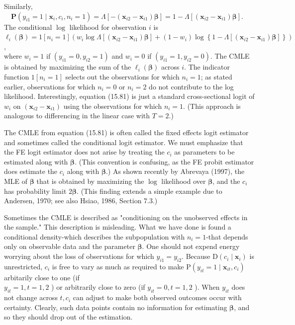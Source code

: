 \documentclass[10pt]{article}
\begin{document}
Similarly, $\quad \mathbf{P}\left(y_{i 1}=1 \mid \mathbf{x}_{i}, c_{i}, n_{i}=1\right)=\Lambda\left[-\left(\mathbf{x}_{i 2}-\mathbf{x}_{i 1}\right) \boldsymbol{\beta}\right]=1-\Lambda\left[\left(\mathbf{x}_{i 2}-\mathbf{x}_{i 1}\right) \boldsymbol{\beta}\right]$. The conditional $\log$ likelihood for observation $i$ is\\
$\ell_{i}(\boldsymbol{\beta})=1\left[n_{i}=1\right]\left(w_{i} \log \Lambda\left[\left(\mathbf{x}_{i 2}-\mathbf{x}_{i 1}\right) \boldsymbol{\beta}\right]+\left(1-w_{i}\right) \log \left\{1-\Lambda\left[\left(\mathbf{x}_{i 2}-\mathbf{x}_{i 1}\right) \boldsymbol{\beta}\right]\right\}\right)$,\\
where $w_{i}=1$ if $\left(y_{i 1}=0, y_{i 2}=1\right)$ and $w_{i}=0$ if $\left(y_{i 1}=1, y_{i 2}=0\right)$. The CMLE is obtained by maximizing the sum of the $\ell_{i}(\boldsymbol{\beta})$ across $i$. The indicator function $1\left[n_{i}=1\right]$ selects out the observations for which $n_{i}=1$; as stated earlier, observations for which $n_{i}=0$ or $n_{i}=2$ do not contribute to the log likelihood. Interestingly, equation (15.81) is just a standard cross-sectional logit of $w_{i}$ on $\left(\mathbf{x}_{i 2}-\mathbf{x}_{i 1}\right)$ using the observations for which $n_{i}=1$. (This approach is analogous to differencing in the linear case with $T=2$.)

The CMLE from equation (15.81) is often called the fixed effects logit estimator and sometimes called the conditional logit estimator. We must emphasize that the FE logit estimator does not arise by treating the $c_{i}$ as parameters to be estimated along with $\boldsymbol{\beta}$. (This convention is confusing, as the FE probit estimator does estimate the $c_{i}$ along with $\boldsymbol{\beta}$.) As shown recently by Abrevaya (1997), the MLE of $\boldsymbol{\beta}$ that is obtained by maximizing the $\log$ likelihood over $\boldsymbol{\beta}$, and the $c_{i}$ has probability limit $2 \boldsymbol{\beta}$. (This finding extends a simple example due to Andersen, 1970; see also Hsiao, 1986, Section 7.3.)

Sometimes the CMLE is described as "conditioning on the unobserved effects in the sample." This description is misleading. What we have done is found a conditional density-which describes the subpopulation with $n_{i}=1$-that depends only on observable data and the parameter $\boldsymbol{\beta}$. One should not expend energy worrying about the loss of observations for which $y_{i 1}=y_{i 2}$. Because $\mathrm{D}\left(c_{i} \mid \mathbf{x}_{i}\right)$ is unrestricted, $c_{i}$ is free to vary as much as required to make $\mathrm{P}\left(y_{i t}=1 \mid \mathbf{x}_{i t}, c_{i}\right)$ arbitarily close to one (if\\
$y_{i t}=1, t=1,2$ ) or arbitrarily close to zero (if $y_{i t}=0, t=1,2$ ). When $y_{i t}$ does not change across $t, c_{i}$ can adjust to make both observed outcomes occur with certainty. Clearly, such data points contain no information for estimating $\boldsymbol{\beta}$, and so they should drop out of the estimation.
\end{document}
